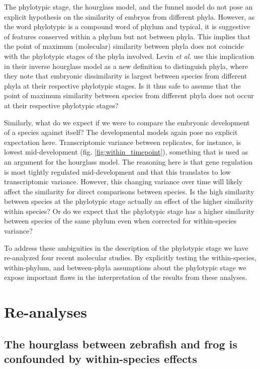 The phylotypic stage, the hourglass model, and the funnel model do not pose an explicit hypothesis on the similarity of embryos from different phyla. However, as the word phylotypic is a compound word of phylum and typical, it is suggestive of features conserved within a phylum but not between phyla. This implies that the point of maximum (molecular) similarity between phyla does not coincide with the phylotypic stages of the phyla involved. Levin \textit{et al.}\cite{Levin2016} use this implication in their inverse hourglass model as a new definition to distinguish phyla, where they note that embryonic dissimilarity is largest between species from different phyla at their respective phylotypic stages. Is it thus safe to assume that the point of maximum similarity between species from different phyla does not occur at their respective phylotypic stages? 

Similarly, what do we expect if we were to compare the embryonic development of a species against itself? The developmental models again pose no explicit expectation here. Transcriptomic variance between replicates, for instance, is lowest mid-development (fig. \ref{fig:within_timepoint}), something that is used as an argument for the hourglass model\cite{Liu2020, Uchida2022}. The reasoning here is that gene regulation is most tightly regulated mid-development and that this translates to low transcriptomic variance. However, this changing variance over time will likely affect the similarity for direct comparisons between species. Is the high similarity between species at the phylotypic stage actually an effect of the higher similarity within species? Or do we expect that the phylotypic stage has a higher similarity between species of the same phylum even when corrected for within-species variance?

To address these ambiguities in the description of the phylotypic stage we have re-analyzed four recent molecular studies. By explicitly testing the within-species, within-phylum, and between-phyla assumptions about the phylotypic stage we expose important flaws in the interpretation of the results from these analyses.

\section{Re-analyses}

\subsection{The hourglass between zebrafish and frog is confounded by within-species effects} \label{subsection:marletaz}

